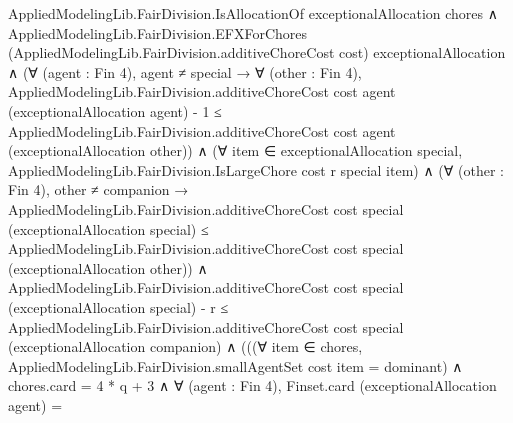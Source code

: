 \documentclass[10pt]{article}
\begin{document}
\begin{ReviewVerbatim}
                                    AppliedModelingLib.FairDivision.IsAllocationOf exceptionalAllocation chores ∧
                                      AppliedModelingLib.FairDivision.EFXForChores
                                          (AppliedModelingLib.FairDivision.additiveChoreCost cost)
                                          exceptionalAllocation ∧
                                        (∀ (agent : Fin 4),
                                            agent ≠ special →
                                              ∀ (other : Fin 4),
                                                AppliedModelingLib.FairDivision.additiveChoreCost cost agent
                                                      (exceptionalAllocation agent) -
                                                    1 ≤
                                                  AppliedModelingLib.FairDivision.additiveChoreCost cost agent
                                                    (exceptionalAllocation other)) ∧
                                          (∀ item ∈ exceptionalAllocation special,
                                              AppliedModelingLib.FairDivision.IsLargeChore cost r special item) ∧
                                            (∀ (other : Fin 4),
                                                other ≠ companion →
                                                  AppliedModelingLib.FairDivision.additiveChoreCost cost special
                                                      (exceptionalAllocation special) ≤
                                                    AppliedModelingLib.FairDivision.additiveChoreCost cost special
                                                      (exceptionalAllocation other)) ∧
                                              AppliedModelingLib.FairDivision.additiveChoreCost cost special
                                                      (exceptionalAllocation special) -
                                                    r ≤
                                                  AppliedModelingLib.FairDivision.additiveChoreCost cost special
                                                    (exceptionalAllocation companion) ∧
                                                (((∀ item ∈ chores,
                                                      AppliedModelingLib.FairDivision.smallAgentSet cost item =
                                                        dominant) ∧
                                                    chores.card = 4 * q + 3 ∧
                                                      ∀ (agent : Fin 4),
                                                        Finset.card (exceptionalAllocation agent) =

\end{ReviewVerbatim}
\end{document}

